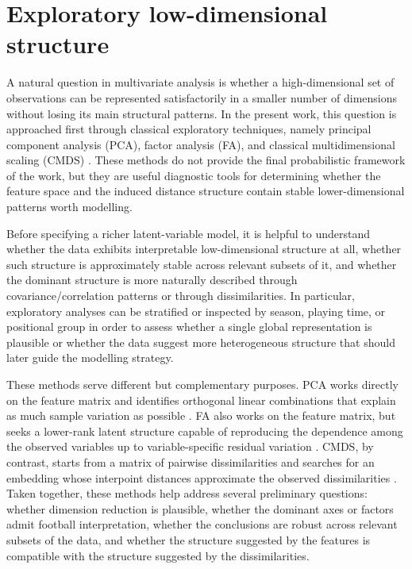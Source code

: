 \section{Exploratory low-dimensional structure}

A natural question in multivariate analysis is whether a high-dimensional set of observations can be represented satisfactorily in a smaller number of dimensions without losing its main structural patterns. In the present work, this question is approached first through classical exploratory techniques, namely principal component analysis (PCA), factor analysis (FA), and classical multidimensional scaling (CMDS) \cite{jolliffe2002pca,bartholomew2011latent,borg2005mds}. These methods do not provide the final probabilistic framework of the work, but they are useful diagnostic tools for determining whether the feature space and the induced distance structure contain stable lower-dimensional patterns worth modelling.

Before specifying a richer latent-variable model, it is helpful to understand whether the data exhibits interpretable low-dimensional structure at all, whether such structure is approximately stable across relevant subsets of it, and whether the dominant structure is more naturally described through covariance/correlation patterns or through dissimilarities. In particular, exploratory analyses can be stratified or inspected by season, playing time, or positional group in order to assess whether a single global representation is plausible or whether the data suggest more heterogeneous structure that should later guide the modelling strategy.

These methods serve different but complementary purposes. PCA works directly on the feature matrix and identifies orthogonal linear combinations that explain as much sample variation as possible \cite{jolliffe2002pca}. FA also works on the feature matrix, but seeks a lower-rank latent structure capable of reproducing the dependence among the observed variables up to variable-specific residual variation \cite{bartholomew2011latent}. CMDS, by contrast, starts from a matrix of pairwise dissimilarities and searches for an embedding whose interpoint distances approximate the observed dissimilarities \cite{borg2005mds}. Taken together, these methods help address several preliminary questions: whether dimension reduction is plausible, whether the dominant axes or factors admit football interpretation, whether the conclusions are robust across relevant subsets of the data, and whether the structure suggested by the features is compatible with the structure suggested by the dissimilarities.


